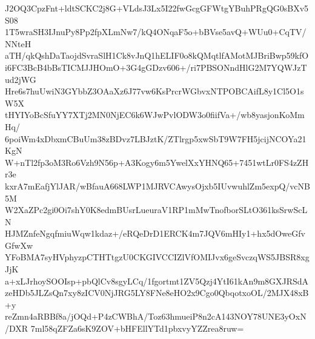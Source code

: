 J2OQ3CpzFnt+ldtSCKC2j8G+VLdsJ3Lx5I22fwGcgGFWtgYBuhPRgQG0sBXv5S08
1T5wraSH3IJnuPy8Pp2fpXLmNw7/kQ4ONqaF5o+bBVse5avQ+WUu0+CqTV/NNteH
aTH/qkQshDaTaojdSvraSlH1Ck8vJnQ1hELIF0o8kQMqtlfAMotMJBriBwp59kfO
i6FC3BcB4bBsTICMJJHOmO+3G4gGDzv606+/ri7PBSONndHlG2M7YQWJzTud2jWG
Hre6s7huUwiN3GYbbZ3OAaXz6J77vw6KsPrcrWGbvxNTPOBCAifL8y1Cl5O1sW5X
tHYIYoBcSfuYY7XTj2MN0NjEC6k6WJwPvlODW3o0fiifVa+/wb8yasjonKoMmHq/
6poiWm4xDbxmCBuUm38zBDvz7LBJztK/ZTlrgp5xwSbT9W7FH5jcijNCOYa21KgN
W+nTl2fp3oM3Ro6Vzh9N56p+A3Kogy6m5YwelXxYHNQ65+7451wtLr0FS4zZHr3e
kxrA7mEafjYlJAR/wBfauA668LWP1MJRVCAwysOjxb5IUvwuhlZm5expQ/vcNB5M
W2XaZPc2gi0Oi7shY0K8edmBUsrLueuraV1RP1mMwTnofborSLtO361ksSrwScLN
HJMZnfeNgqfmiuWqw1kdaz+/eRQeDrD1ERCK4m7JQV6mHIy1+hx5dOweGfvGfwXw
YFoBMA7syHVphyzpCTHTtgzU0CKGIVCCIZlVfOMIJvx6geSvczqWS5JBSR8xgJjK
a+xLJrhoySOOIsp+pbQlCv8sgyLCq/1fgortmt1ZV5Qzj4YtI61kAn9m8GXJRSdA
zeHDb5JLZsQn7xy8zICV0NjJRG5LY8FNe8eHO2x9Cgo0QbqotxoOL/2MJX48xB+y
reZmn4aRBBf8a/jOQd+P4zCWBhA/Toz63hmueiP8n2cA143NOY78UNE3yOxN/DXR
7ml58qZFZa6sK9ZOV+bHFEllYTd1pbxvyYZZrea8ruw=
